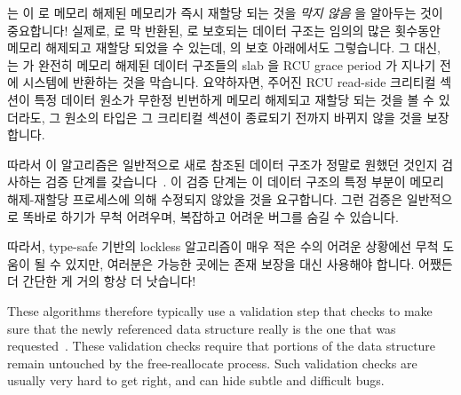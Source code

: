  는  이 
로 메모리 해제된 메모리가 즉시 재할당 되는 것을 \emph{막지 않음} 을 알아두는
것이 중요합니다!
실제로,  로 막 반환된,  로
보호되는 데이터 구조는 임의의 많은 횟수동안 메모리 해제되고 재할당 되었을 수
있는데,  의 보호 아래에서도 그렇습니다.
그 대신,  는  가 완전히 메모리
해제된 데이터 구조들의 slab 을 RCU grace period 가 지나기 전에 시스템에
반환하는 것을 막습니다.
요약하자면, 주어진 RCU read-side 크리티컬 섹션이 특정 
데이터 원소가 무한정 빈번하게 메모리 해제되고 재할당 되는 것을 볼 수 있더라도,
그 원소의 타입은 그 크리티컬 섹션이 종료되기 전까지 바뀌지 않을 것을
보장합니다.

따라서 이 알고리즘은 일반적으로 새로 참조된 데이터 구조가 정말로 원했던 것인지
검사하는 검증 단계를 갖습니다~\cite[Section~2.5]{LaninShasha1986TSM}.
이 검증 단계는 이 데이터 구조의 특정 부분이 메모리 해제-재할당 프로세스에 의해
수정되지 않았을 것을 요구합니다.
그런 검증은 일반적으로 똑바로 하기가 무척 어려우며, 복잡하고 어려운 버그를 숨길
수 있습니다.

따라서, type-safe 기반의 lockless 알고리즘이 매우 적은 수의 어려운 상황에선
무척 도움이 될 수 있지만, 여러분은 가능한 곳에는 존재 보장을 대신 사용해야
합니다.
어쨌든 더 간단한 게 거의 항상 더 낫습니다!

\iffalse

These algorithms therefore typically use a validation step that checks
to make sure that the newly referenced data structure really is the one
that was requested~\cite[Section~2.5]{LaninShasha1986TSM}.
These validation checks require that portions of the data structure
remain untouched by the free-reallocate process.
Such validation checks are usually very hard to get right, and can
hide subtle and difficult bugs.

